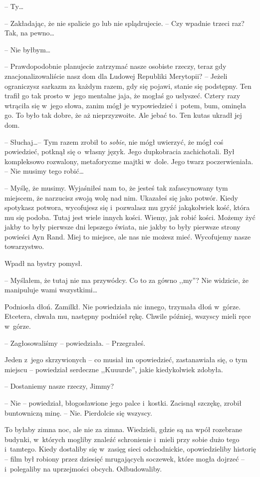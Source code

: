 \documentclass[oneside,polish,11pt,sfheadings]{mwbk}
\begin{document}
-- Ty\ldots 

-- Zakładając, że nie spalicie go lub nie splądrujecie. -- Czy wpadnie
trzeci raz? Tak, na pewno\ldots 

-- Nie byłbym\ldots 

-- Prawdopodobnie planujecie zatrzymać nasze osobiste rzeczy, teraz gdy
znacjonalizowaliście nasz dom dla Ludowej Republiki Merytopii? -- Jeżeli
ograniczysz sarkazm za każdym razem, gdy się pojawi, stanie się
podstępny. Ten trafił go tak prosto w~jego mentalne jaja, że mogłaś go
usłyszeć. Cztery razy wtrąciła się w~jego słowa, zanim mógł je
wypowiedzieć i~potem, bum, ominęła go. To było tak dobre, że aż
nieprzyzwoite. Ale jebać to. Ten kutas ukradł jej dom.

-- Słuchaj\ldots  -- Tym razem zrobił to \textit{sobie}, nie mógł uwierzyć, że
mógł coś powiedzieć, potknął się o~własny język. Jego dupkobracia
zachichotali. Był kompleksowo rozwalony, metaforyczne majtki w~dole.
Jego twarz poczerwieniała. -- Nie musimy tego robić\ldots 

-- Myślę, że musimy. Wyjaśniłeś nam to, że jesteś tak zafascynowany tym
miejscem, że narzucisz swoją wolę nad nim. Ukazałeś się jako potwór.
Kiedy spotykasz potwora, wycofujesz się i~pozwalasz mu gryźć jakąkolwiek
kość, która mu się podoba. Tutaj jest wiele innych kości. Wiemy, jak
robić kości. Możemy żyć jakby to były pierwsze dni lepszego świata, nie
jakby to były pierwsze strony powieści Ayn Rand. Miej to miejsce, ale
nas nie możesz mieć. Wycofujemy nasze towarzystwo.

Wpadł na bystry pomysł. 

-- Myślałem, że tutaj nie ma przywódcy. Co to za
gówno ,,my''? Nie widzicie, że manipuluje wami wszystkimi\ldots 

Podniosła dłoń. Zamilkł. Nie powiedziała nic innego, trzymała dłoń w~górze. Etcetera, chwała mu, następny podniósł rękę. Chwile później,
wszyscy mieli ręce w~górze.

-- Zagłosowaliśmy -- powiedziała. -- Przegrałeś.

Jeden z~jego skrzywionych -- co musiał im opowiedzieć, zastanawiała się,
o tym miejscu -- powiedział serdeczne ,,Kuuurde'', jakie kiedykolwiek
zdobyła.

-- Dostaniemy nasze rzeczy, Jimmy?

-- Nie -- powiedział, błogosławione jego palce i~kostki. Zacisnął szczękę,
zrobił buntowniczą minę. -- Nie. Pierdolcie się wszyscy.

To byłaby zimna noc, ale nie za zimna. Wiedzieli, gdzie są na wpół
rozebrane budynki, w~których mogliby znaleźć schronienie i~mieli przy
sobie dużo tego i~tamtego. Kiedy dostaliby się w~zasięg sieci
odchodnickie, opowiedzieliby historię -- film był robiony przez dziesięć
mrugających soczewek, które mogła dojrzeć -- i~polegaliby na uprzejmości
obcych. Odbudowaliby.
\end{document}
